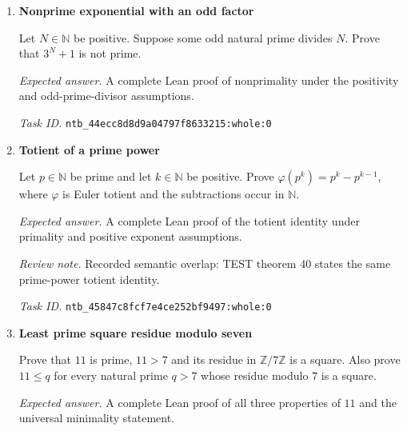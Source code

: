 \documentclass[11pt]{article}
\newcommand{\pth}[1]{\nolinkurl{#1}}
\begin{document}
\begin{enumerate}[label={TEST \arabic*.},leftmargin=4.5em,itemsep=1em]
Prove that the following universal claim is false. Every natural prime $p>5$ for which $-5$ is a square in $\mathbb{Z}/p\mathbb{Z}$ has positive natural $m,n,k$ with $p^2=m^2+5n^2+6k^2$; every such positive representation has $m+n+k\ge6$; and some such representation has $m+n+k=6$.

\emph{Expected answer.} A complete Lean proof negating the universal conjunction of representation existence, the lower bound for every positive representation, and attainment of that bound.

\emph{Review note.} The target is the negation of the entire universal claim, not a request to construct those representations for every qualifying prime.

\emph{Task ID.} \pth{ntb_43bce97fd20bfa368ddf2b30:whole:0}

\item \textbf{Nonprime exponential with an odd factor}\label{qn:test:24}

Let $N\in\mathbb{N}$ be positive. Suppose some odd natural prime divides $N$. Prove that $3^N+1$ is not prime.

\emph{Expected answer.} A complete Lean proof of nonprimality under the positivity and odd-prime-divisor assumptions.

\emph{Task ID.} \pth{ntb_44ecc8d8d9a04797f8633215:whole:0}

\item \textbf{Totient of a prime power}\label{qn:test:25}

Let $p\in\mathbb{N}$ be prime and let $k\in\mathbb{N}$ be positive. Prove $\varphi(p^k)=p^k-p^{k-1}$, where $\varphi$ is Euler totient and the subtractions occur in $\mathbb{N}$.

\emph{Expected answer.} A complete Lean proof of the totient identity under primality and positive exponent assumptions.

\emph{Review note.} Recorded semantic overlap: TEST theorem 40 states the same prime-power totient identity.

\emph{Task ID.} \pth{ntb_45847c8fcf7e4ce252bf9497:whole:0}

\item \textbf{Least prime square residue modulo seven}\label{qn:test:26}

Prove that $11$ is prime, $11>7$ and its residue in $\mathbb{Z}/7\mathbb{Z}$ is a square. Also prove $11\le q$ for every natural prime $q>7$ whose residue modulo $7$ is a square.

\emph{Expected answer.} A complete Lean proof of all three properties of $11$ and the universal minimality statement.


\end{enumerate}
\end{document}
